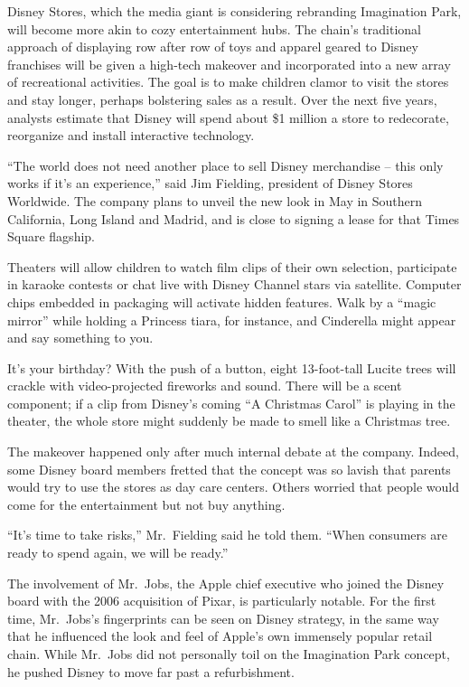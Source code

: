 ﻿\documentclass[12pt]{article}
\begin{document}
Disney Stores, which the media giant is considering rebranding Imagination Park, will become more
akin to cozy entertainment hubs. The chain's traditional approach of displaying row after row of
toys and apparel geared to Disney franchises will be given a high-tech makeover and incorporated
into a new array of recreational activities. The goal is to make children clamor to visit the stores
and stay longer, perhaps bolstering sales as a result. Over the next five years, analysts estimate
that Disney will spend about \$1 million a store to redecorate, reorganize and install interactive
technology.

``The world does not need another place to sell Disney merchandise -- this only works if it's an
experience,'' said Jim Fielding, president of Disney Stores Worldwide. The company plans to unveil
the new look in May in Southern California, Long Island and Madrid, and is close to signing a lease
for that Times Square flagship.

Theaters will allow children to watch film clips of their own selection, participate in karaoke
contests or chat live with Disney Channel stars via satellite. Computer chips embedded in packaging
will activate hidden features. Walk by a ``magic mirror'' while holding a Princess tiara, for
instance, and Cinderella might appear and say something to you.

It's your birthday? With the push of a button, eight 13-foot-tall Lucite trees will crackle with
video-projected fireworks and sound. There will be a scent component; if a clip from Disney's coming
``A Christmas Carol'' is playing in the theater, the whole store might suddenly be made to smell
like a Christmas tree.

The makeover happened only after much internal debate at the company. Indeed, some Disney board
members fretted that the concept was so lavish that parents would try to use the stores as day care
centers. Others worried that people would come for the entertainment but not buy anything.

``It's time to take risks,'' Mr.~Fielding said he told them. ``When consumers are ready to spend
again, we will be ready.''

The involvement of Mr.~Jobs, the Apple chief executive who joined the Disney board with the 2006
acquisition of Pixar, is particularly notable. For the first time, Mr.~Jobs's fingerprints can be
seen on Disney strategy, in the same way that he influenced the look and feel of Apple's own
immensely popular retail chain. While Mr.~Jobs did not personally toil on the Imagination Park
concept, he pushed Disney to move far past a refurbishment.
\end{document}
